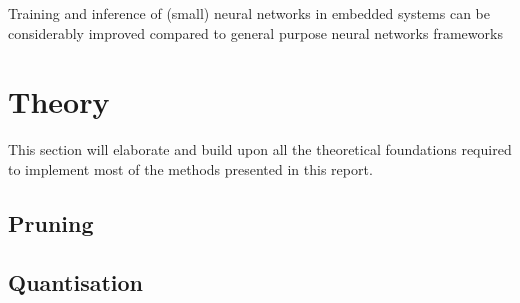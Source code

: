 Training and inference of (small) neural networks in embedded systems can be considerably improved compared to general purpose neural networks frameworks



\chapter{Theory}
This section will elaborate and build upon all the theoretical foundations required to implement most of the methods presented in this report.

\section{Pruning}

\section{Quantisation}